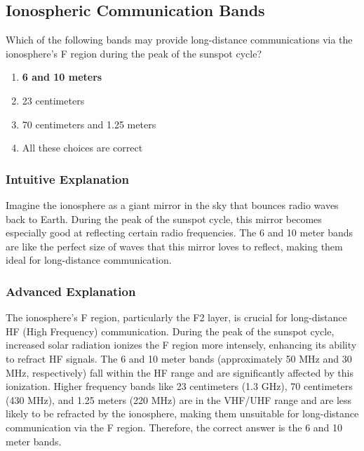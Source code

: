 \subsection{Ionospheric Communication Bands}
\label{T3C10}

\begin{tcolorbox}[colback=gray!10!white,colframe=black!75!black,title=T3C10]
Which of the following bands may provide long-distance communications via the ionosphere’s F region during the peak of the sunspot cycle?
\begin{enumerate}[noitemsep]
    \item \textbf{6 and 10 meters}
    \item 23 centimeters
    \item 70 centimeters and 1.25 meters
    \item All these choices are correct
\end{enumerate}
\end{tcolorbox}

\subsubsection*{Intuitive Explanation}
Imagine the ionosphere as a giant mirror in the sky that bounces radio waves back to Earth. During the peak of the sunspot cycle, this mirror becomes especially good at reflecting certain radio frequencies. The 6 and 10 meter bands are like the perfect size of waves that this mirror loves to reflect, making them ideal for long-distance communication.

\subsubsection*{Advanced Explanation}
The ionosphere's F region, particularly the F2 layer, is crucial for long-distance HF (High Frequency) communication. During the peak of the sunspot cycle, increased solar radiation ionizes the F region more intensely, enhancing its ability to refract HF signals. The 6 and 10 meter bands (approximately 50 MHz and 30 MHz, respectively) fall within the HF range and are significantly affected by this ionization. Higher frequency bands like 23 centimeters (1.3 GHz), 70 centimeters (430 MHz), and 1.25 meters (220 MHz) are in the VHF/UHF range and are less likely to be refracted by the ionosphere, making them unsuitable for long-distance communication via the F region. Therefore, the correct answer is the 6 and 10 meter bands.